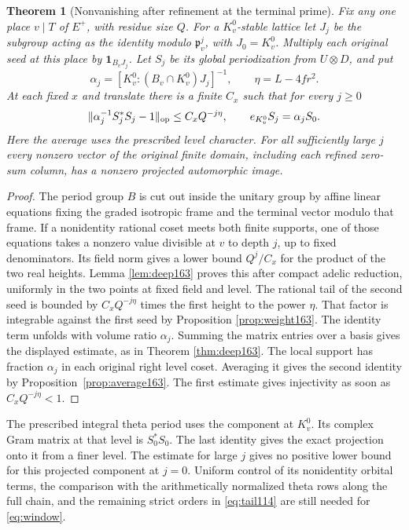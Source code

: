 \documentclass[a4paper,11pt]{article}
\newtheorem{theorem}[proposition]{Theorem}
\theoremstyle{definition}
\theoremstyle{remark}
\numberwithin{equation}{section}
\begin{document}
\begin{theorem}[Nonvanishing after refinement at the terminal prime]
\label{thm:depth164}
Fix any one place \(v\mid T\) of \(E^+\), with residue size
\(Q\). For a \(K_v^0\)-stable lattice let \(J_j\) be the
subgroup acting as the identity modulo \(\mathfrak p_v^j\),
with \(J_0=K_v^0\). Multiply each original seed at this place
by \(\mathbf1_{B_vJ_j}\). Let \(S_j\) be its global
periodization from \(U\otimes D\), and put
\[
     \alpha_j=[K_v^0:(B_v\cap K_v^0)J_j]^{-1},\qquad
     \eta=L-4fr^2 .
\]
At each fixed \(x\) and translate there is a finite \(C_x\)
such that for every \(j\ge0\)
\[
       \|\alpha_j^{-1}S_j^*S_j-1\|_{\rm op}
                      \le C_x Q^{-j\eta},
       \qquad e_{K_v^0}S_j=\alpha_j S_0 .
\]
Here the average uses the prescribed level character. For
all sufficiently large \(j\) every nonzero vector of the
original finite domain, including each refined zero-sum column,
has a nonzero projected automorphic image.
\end{theorem}
\begin{proof}
The period group \(B\) is cut out inside the unitary group by
affine linear equations fixing the graded isotropic frame and
the terminal vector modulo that frame. If a nonidentity
rational coset meets both finite supports, one of those
equations takes a nonzero value divisible at \(v\) to depth
\(j\), up to fixed denominators. Its field norm gives a lower
bound \(Q^j/C_x\) for the product of the two real heights.
Lemma \ref{lem:deep163} proves this after compact adelic
reduction, uniformly in the two points at fixed field and
level. The rational tail of the second seed is bounded by
\(C_x Q^{-j\eta}\) times the first height to the power
\(\eta\). That factor is integrable against the first seed
by Proposition \ref{prop:weight163}. The identity term unfolds
with volume ratio \(\alpha_j\). Summing the matrix entries
over a basis gives the displayed estimate, as in Theorem \ref{thm:deep163}. The local support has fraction \(\alpha_j\)
in each original right level coset. Averaging it gives the
second identity by Proposition~\ref{prop:average163}. The first estimate
gives injectivity as soon as \(C_x Q^{-j\eta}<1\).
\end{proof}

The prescribed integral theta period uses the component at
\(K_v^0\). Its complex Gram matrix at that level is \(S_0^*S_0\).
The last identity gives the exact projection onto it from a
finer level. The estimate for large \(j\) gives no positive
lower bound for this projected component at \(j=0\).
Uniform control of its nonidentity orbital terms, the comparison
with the arithmetically normalized theta rows along the full
chain, and the remaining strict orders in \eqref{eq:tail114}
are still needed for \eqref{eq:window}.
\end{document}

